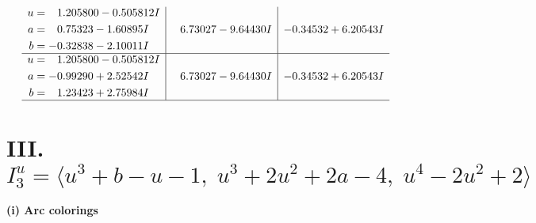 \documentclass[1p]{elsarticle_modified}
\theoremstyle{definition}
\begin{document}
$$\begin{array}{c|c|c}
\begin{aligned}
u &= \phantom{-}1.205800 - 0.505812 I \\
a &= \phantom{-}0.75323 - 1.60895 I \\
b &= -0.32838 - 2.10011 I\end{aligned}
 & \phantom{-}6.73027 - 9.64430 I & -0.34532 + 6.20543 I \\ \hline\begin{aligned}
u &= \phantom{-}1.205800 - 0.505812 I \\
a &= -0.99290 + 2.52542 I \\
b &= \phantom{-}1.23423 + 2.75984 I\end{aligned}
 & \phantom{-}6.73027 - 9.64430 I & -0.34532 + 6.20543 I\\
 \hline 
 \end{array}$$\newpage\newpage\renewcommand{\arraystretch}{1}
\centering \section*{III. $I^u_{3}= \langle u^3+b- u-1,\;u^3+2 u^2+2 a-4,\;u^4-2 u^2+2 \rangle$}
\flushleft \textbf{(i) Arc colorings}\\
\end{document}
